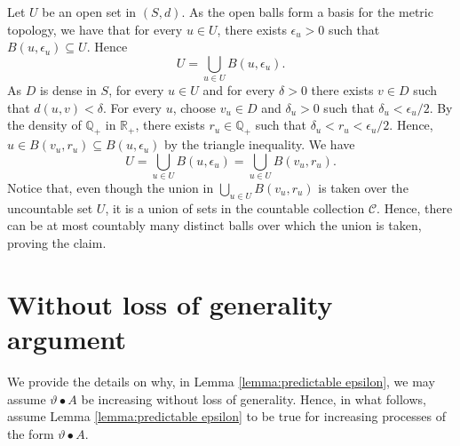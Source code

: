 \documentclass[11pt,a4paper,twoside,openany]{report}
\numberwithin{equation}{section}
\theoremstyle{plain} %
\theoremstyle{definition} %
\theoremstyle{remark} %
\begin{document}
Let \(U\) be an open set in \((S,d)\). As the open balls form a basis for the metric topology, we have that for every \(u\in U\), there exists \(\epsilon_u>0\) such that \(B(u,\epsilon_u)\subseteq U\). Hence
\begin{equation*}
    U=\bigcup_{u\in U}B(u,\epsilon_u).
\end{equation*}
As \(D\) is dense in \(S\), for every \(u\in U\) and for every \(\delta>0\) there exists \(v\in D\) such that \(d(u,v)<\delta\). For every \(u\), choose \(v_u\in D\) and \(\delta_u>0\) such that \(\delta_u<\epsilon_u/2\). By the density of \(\mathbb{Q}_+\) in \(\mathbb{R}_+\), there exists \(r_u\in\mathbb{Q}_+\) such that \(\delta_u<r_u<\epsilon_u/2\). Hence, \(u\in B(v_u,r_u)\subseteq B(u,\epsilon_u)\) by the triangle inequality. We have 
\begin{equation*}
   U=\bigcup_{u\in U}B(u,\epsilon_u)= \bigcup_{u\in U}B(v_u,r_u).
\end{equation*}
Notice that, even though the union in \(\bigcup_{u\in U}B(v_u,r_u)\) is taken over the uncountable set \(U\), it is a union of sets in the countable collection \(\mathcal{C}\). Hence, there can be at most countably many distinct balls over which the union is taken, proving the claim.


\section{Without loss of generality argument }\label{Appendix:w.l.o.g.}
We provide the details on why, in Lemma \ref{lemma:predictable epsilon}, we may assume \(\vartheta\bullet A\) be increasing without loss of generality. Hence, in what follows, assume Lemma \ref{lemma:predictable epsilon} to be true for increasing processes of the form \(\vartheta\bullet A\).
\end{document}
